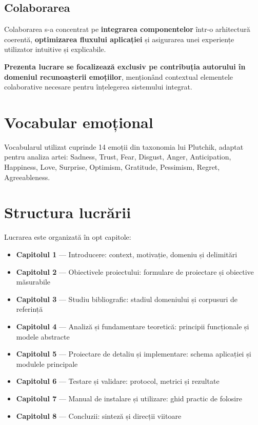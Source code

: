 \subsection*{Colaborarea}
Colaborarea s-a concentrat pe \textbf{integrarea componentelor} într-o arhitectură coerentă, \textbf{optimizarea fluxului aplicației} și asigurarea unei experiențe utilizator intuitive și explicabile. 

\textbf{Prezenta lucrare se focalizează exclusiv pe contribuția autorului în domeniul recunoașterii emoțiilor}, menționând contextual elementele colaborative necesare pentru înțelegerea sistemului integrat.

\section{Vocabular emoțional}
\label{sec:intro-vocabular}

Vocabularul utilizat cuprinde 14 emoții din taxonomia lui Plutchik, adaptat pentru analiza artei: Sadness, Trust, Fear, Disgust, Anger, Anticipation, Happiness, Love, Surprise, Optimism, Gratitude, Pessimism, Regret, Agreeableness.

\section{Structura lucrării}
\label{sec:intro-structura}

Lucrarea este organizată în opt capitole:

\begin{itemize}
  \item \textbf{Capitolul 1} — Introducere: context, motivație, domeniu și delimitări
  \item \textbf{Capitolul 2} — Obiectivele proiectului: formulare de proiectare și obiective măsurabile
  \item \textbf{Capitolul 3} — Studiu bibliografic: stadiul domeniului și corpusuri de referință
  \item \textbf{Capitolul 4} — Analiză și fundamentare teoretică: principii funcționale și modele abstracte
  \item \textbf{Capitolul 5} — Proiectare de detaliu și implementare: schema aplicației și modulele principale
  \item \textbf{Capitolul 6} — Testare și validare: protocol, metrici și rezultate
  \item \textbf{Capitolul 7} — Manual de instalare și utilizare: ghid practic de folosire
  \item \textbf{Capitolul 8} — Concluzii: sinteză și direcții viitoare
\end{itemize}

